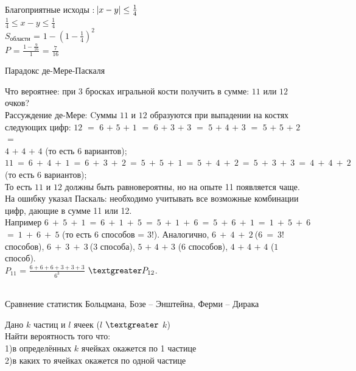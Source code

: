 \documentclass[russian, 12pt, fleqn]{article}
\begin{document}
Благоприятные исходы : $\abs{x - y} \leq \frac{1}{4}$\\
$\frac{1}{4} \leq x - y \leq \frac{1}{4}$\\	
$S_{области}$ = $1 - {(1 - \frac{1}{4})}^2$\\
$P$ = $\frac{1 - \frac{9}{16}}{1}$ = $\frac{7}{16}$
\begin{center}
$\textbf{Парадокс де-Мере-Паскаля }$
\end{center}
Что вероятнее: при $3$ бросках игральной кости получить в сумме: $11$ или $12$ очков?\\
Рассуждение де-Мере: Cуммы $11$ и $12$ образуются при выпадении на костях следующих цифр: $12$ $=$ $6$ $+$  $5$ $+$ $1$ $=$ $6$ $+$ $3$ $+$ $3$ $=$ $5$ $+$ $4$ $+$ $3$ $=$ $5$ $+$ $5$ $+$ $2$ $=$ \\
$4$ $+$ $4$ $+$ $4$ (то есть $6$ вариантов);\\
$11\ =\  6\ +\ 4\ +\ 1\ =\ 6\ +\ 3\ +\ 2\ =\ 5\ +\ 5\ +\ 1\ =\ 5\ +\ 4\ +\ 2\ =\ 5\ +\ 3\ +\ 3\ =\ 4\ +\ 4\ +\ 2\ $(то есть $6$ вариантов);\\
То есть $11$ и $12$ должны быть равновероятны, но на опыте 11 появляется чаще.\\
На ошибку указал Паскаль: необходимо учитывать все возможные комбинации цифр, дающие в сумме 11 или 12.\\
Например $6\ +\ 5\ +\ 1\ =\ 6\ +\ 1\ +\ 5\ =\ 5\ +\ 1\ +\ 6\ =\ 5\ +\  6\ +\ 1\ =\ 1\ +\ 5\ +\ 6$\\
$=\ 1\ +\ 6\ +\ 5$ (то есть $6$ способов = $3$!). Аналогично, $6\ +\ 4\ +\ 2\  $($6\ =\ 3!$ способов), $6\ +\ 3\ +\  3\ $($3$ способа), $5$ $+$ $4$ $+$ $3$ ($6$ способов), $4$ $+$ $4$ $+$ $4$ ($1$ способ).\\
$P_{11}$ = $\frac{6 +  6 + 6 + 3 + 3 + 3}{6^3}$  $\textgreater P_{12}$.\\
\\
\begin{center}
$\textbf{Сравнение статистик Больцмана, Бозе -- Энштейна, Ферми -- Дирака }$
\end{center}
Дано $k$ частиц и $l$ ячеек ($l$ $\textgreater$ $k$)\\
Найти вероятность того что:\\
	1)в определённых $k$ ячейках окажется по 1 частице\\
	2)в каких то ячейках окажется по одной частице\\
\end{document}
